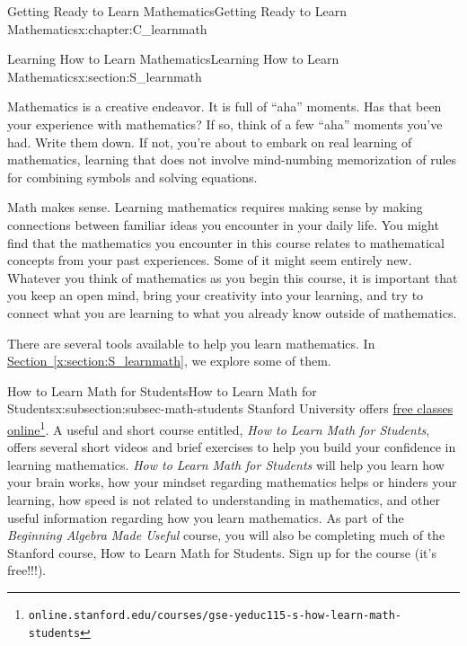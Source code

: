 \documentclass[oneside,10pt,]{book}
\newcommand{\xreffont}{\relax}
\newcommand{\pubtitle}[1]{\textsl{#1}}
\numberwithin{equation}{chapter}
\begin{document}
\typeout{************************************************}
%
\begin{chapterptx}{Getting Ready to Learn Mathematics}{}{Getting Ready to Learn Mathematics}{}{}{x:chapter:C_learnmath}
%
%
\typeout{************************************************}
\typeout{************************************************}
%
\begin{sectionptx}{Learning How to Learn Mathematics}{}{Learning How to Learn Mathematics}{}{}{x:section:S_learnmath}
\begin{introduction}{}%
Mathematics is a creative endeavor. It is full of ``aha'' moments. Has that been your experience with mathematics? If so, think of a few ``aha'' moments you've had. Write them down. If not, you're about to embark on real learning of mathematics, learning that does not involve mind-numbing memorization of rules for combining symbols and solving equations.%
\par
Math makes sense. Learning mathematics requires making sense by making connections between familiar ideas you encounter in your daily life. You might find that the mathematics you encounter in this course relates to mathematical concepts from your past experiences. Some of it might seem entirely new. Whatever you think of mathematics as you begin this course, it is important that you keep an open mind, bring your creativity into your learning, and try to connect what you are learning to what you already know outside of mathematics.%
\par
There are several tools available to help you learn mathematics. In \hyperref[x:section:S_learnmath]{Section~{\xreffont\ref{x:section:S_learnmath}}}, we explore some of them.%
\end{introduction}%
%
%
\typeout{************************************************}
\typeout{************************************************}
%
\begin{subsectionptx}{How to Learn Math for Students}{}{How to Learn Math for Students}{}{}{x:subsection:subsec-math-students}
Stanford University offers \href{https://online.stanford.edu/courses/gse-yeduc115-s-how-learn-math-students}{free classes online}\footnote{\nolinkurl{online.stanford.edu/courses/gse-yeduc115-s-how-learn-math-students}\label{g:fn:idp1706643864}}. A useful and short course entitled, \pubtitle{How to Learn Math for Students}, offers several short videos and brief exercises to help you build your confidence in learning mathematics. \pubtitle{How to Learn Math for Students} will help you learn how your brain works, how your mindset regarding mathematics helps or hinders your learning, how speed is not related to understanding in mathematics, and other useful information regarding how you learn mathematics. As part of the \pubtitle{Beginning Algebra Made Useful} course, you will also be completing much of the Stanford course, How to Learn Math for Students. Sign up for the course (it's free!!!).%

\end{subsectionptx}
\end{sectionptx}
\end{chapterptx}
\end{document}
